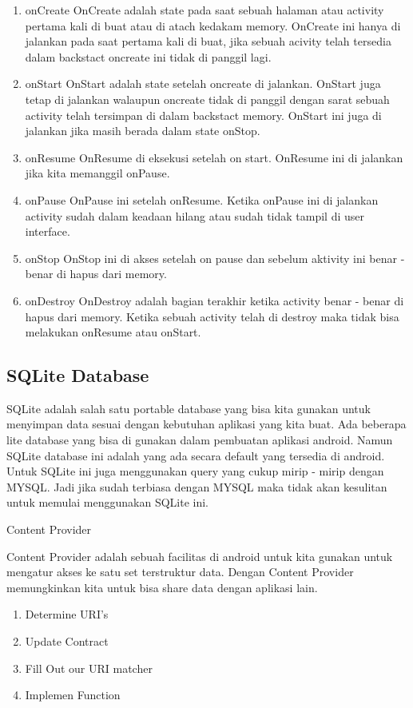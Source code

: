 \begin{enumerate}
	\item onCreate OnCreate adalah state pada saat sebuah halaman atau activity pertama kali di buat atau di atach kedakam memory. OnCreate ini hanya di jalankan pada saat pertama kali di buat, jika sebuah acivity telah tersedia dalam backstact oncreate ini tidak di panggil lagi.
	\item onStart OnStart adalah state setelah oncreate di jalankan. OnStart juga tetap di jalankan walaupun oncreate tidak di panggil dengan sarat sebuah activity telah tersimpan di dalam backstact memory. OnStart ini juga di jalankan jika masih berada dalam state onStop.
	\item onResume OnResume di eksekusi setelah on start. OnResume ini di jalankan jika kita memanggil onPause.
	\item onPause OnPause ini setelah onResume. Ketika onPause ini di jalankan activity sudah dalam keadaan hilang atau sudah tidak tampil di user interface.
	\item onStop OnStop ini di akses setelah on pause dan sebelum aktivity ini benar - benar di hapus dari memory.
	\item onDestroy OnDestroy adalah bagian terakhir ketika activity benar - benar di hapus dari memory. Ketika sebuah activity telah di destroy maka tidak bisa melakukan onResume atau onStart.
\end{enumerate}
   

\subsection{SQLite Database}
\vspace{12pt}
\noindent 
SQLite adalah salah satu portable database yang bisa kita gunakan untuk menyimpan data sesuai dengan kebutuhan aplikasi yang kita buat. Ada beberapa lite database yang bisa di gunakan dalam pembuatan aplikasi android. Namun SQLite database ini adalah yang ada secara default yang tersedia di android. Untuk SQLite ini juga menggunakan query yang cukup mirip - mirip dengan MYSQL. Jadi jika sudah terbiasa dengan MYSQL maka tidak akan kesulitan untuk memulai menggunakan SQLite ini. \par
\vspace{12pt}
\noindent 
Content Provider \par
\vspace{12pt}
\noindent 
Content Provider adalah sebuah facilitas di android untuk kita gunakan untuk mengatur akses ke satu set terstruktur data. Dengan Content Provider memungkinkan kita untuk bisa share data dengan aplikasi lain. \par
\begin{enumerate}
	\item Determine URI's
	\item Update Contract
	\item Fill Out our URI matcher
	\item Implemen Function
\end{enumerate}


